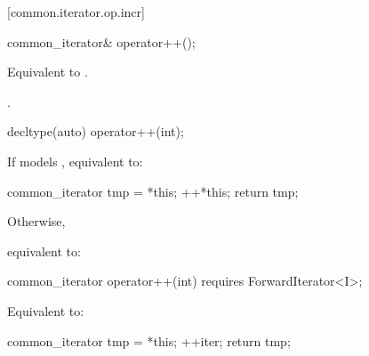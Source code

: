 \begin{addedblock}
[common.iterator.op.incr]{}

%
%
\begin{itemdecl}
common_iterator& operator++();
\end{itemdecl}

\begin{itemdescr}
\pnum
{}

\pnum
\newtxt{\expects
}

\pnum
\effects Equivalent to .

\pnum
\returns {}.
\end{itemdescr}

%
%
\begin{itemdecl}
decltype(auto) operator++(int);
\end{itemdecl}

\begin{itemdescr}
\pnum
{}

\pnum
\newtxt{\expects
}

\pnum
\effects
{\color{newclr}
If  models , equivalent to:
\begin{codeblock}
common_iterator tmp = *this;
++*this;
return tmp;
\end{codeblock}
Otherwise,} %
equivalent to: 
\end{itemdescr}

{\color{oldclr}
\begin{itemdecl}
common_iterator operator++(int)
  requires ForwardIterator<I>;
\end{itemdecl}

\begin{itemdescr}
\pnum
\requires
{}

\pnum
\effects Equivalent to:
\begin{codeblock}
common_iterator tmp = *this;
++iter;
return tmp;
\end{codeblock}
\end{itemdescr}
} %


\end{addedblock}
